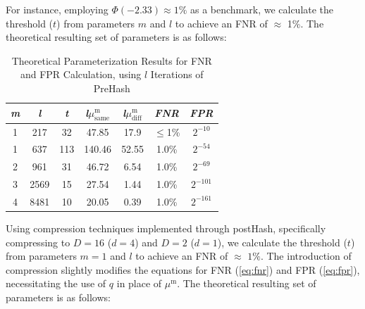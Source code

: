 For instance, employing \(\Phi(-2.33) \approx 1\%\) as a benchmark, we calculate the threshold (\(t\)) from parameters \(m\) and \(l\) to achieve an FNR of \(\approx\) 1\%. The theoretical resulting set of parameters is as follows: 

\begin{table}[htbp] 
    \centering
    \begin{tabular}{|c|c|c|c|c|c|c|}
        \hline
        \textit{m} & \textit{l} & \textit{t} & \textit{l}\(\mu_{\text{same}}^\text{m}\) & \textit{l}\(\mu_{\text{diff}}^\text{m}\) & \textit{FNR} & \textit{FPR} \\
        \hline
        1 & 217 & 32 & 47.85 & 17.9 & \(\leq\)1\% & \(2^{-10}\)\\
        1 & 637 & 113 & 140.46 & 52.55 & 1.0\% & \(2^{-54}\) \\
        2 & 961 & 31 & 46.72 & 6.54 & 1.0\% & \(2^{-69}\) \\
        3 & 2569 & 15 & 27.54 & 1.44 & 1.0\% &\(2^{-101}\) \\
        4 & 8481 & 10 & 20.05 & 0.39 & 1.0\% & \(2^{-161}\) \\
        \hline
    \end{tabular}
    \caption{Theoretical Parameterization Results for FNR and FPR Calculation, using $l$ Iterations of PreHash}
    \label{tab:theoretical_parameterization_PreHash}
\end{table}

Using compression techniques implemented through postHash, specifically compressing to \( D = 16 \) (\( d = 4 \)) and \( D = 2 \) (\( d = 1 \)), we calculate the threshold (\( t \)) from parameters \( m = 1 \) and \( l \) to achieve an FNR of \(\approx\) \(1\%\). The introduction of compression slightly modifies the equations for FNR (\ref{eq:fnr}) and FPR (\ref{eq:fpr}), necessitating the use of \( q \) in place of \(\mu^\text{m}\). The theoretical resulting set of parameters is as follows:

